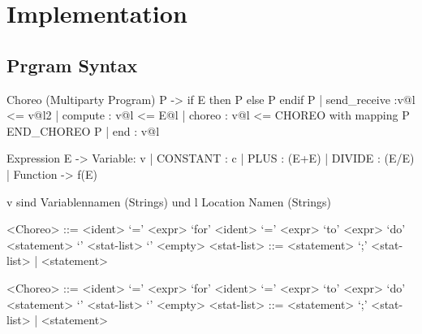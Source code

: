 \chapter{Implementation}
\label{ch:implementation}


\section{Prgram Syntax}

Choreo (Multiparty Program) P -> if E then P else P endif P
\newline| send_receive 		:v@l <= v@l2
\newline| compute      		: v@l <= E@l
\newline| choreo 			: v@l <= CHOREO with mapping P END_CHOREO P
\newline| end 				: v@l

Expression E -> Variable: v
\newline| CONSTANT : c
\newline| PLUS     : (E+E)
\newline| DIVIDE   : (E/E)
\newline| Function -> f(E)

v sind Variablennamen (Strings) und l Location Namen (Strings)

\begin{grammar}
<Choreo> ::= <ident> ‘=’ <expr>
\alt ‘for’ <ident> ‘=’ <expr> ‘to’ <expr> ‘do’ <statement>
\alt ‘{’ <stat-list> ‘}’
\alt <empty>
<stat-list> ::= <statement> ‘;’ <stat-list> | <statement>
\end{grammar}


\begin{grammar}
<Choreo> ::= <ident> ‘=’ <expr>
\alt ‘for’ <ident> ‘=’ <expr> ‘to’ <expr> ‘do’ <statement>
\alt ‘{’ <stat-list> ‘}’
\alt <empty>
<stat-list> ::= <statement> ‘;’ <stat-list> | <statement>
\end{grammar}

